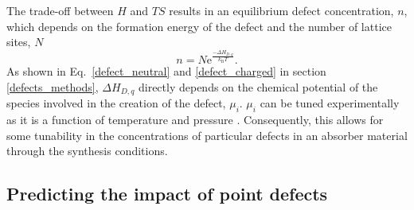 \documentclass[11pt, twoside]{report}
\begin{document}
The trade-off between $H$ and $TS$ results in an equilibrium defect concentration, $n$, which depends on the formation energy of the defect and the number of lattice sites, $N$
\begin{equation}\label{defect_conc2}
n = N \mathrm{e}^{\frac{-\Delta H_{D,q}}{k_\mathrm{B} T}}.
\end{equation}
As shown in Eq.~\ref{defect_neutral} and \ref{defect_charged} in section \ref{defects_methods}, $\Delta H_{D,q}$ directly depends on the chemical potential of the species involved in the creation of the defect, $\mu_i$. $\mu_i$ can be tuned experimentally as it is a function of temperature and pressure \cite{Adam_sulfur}. Consequently, this allows for some tunability in the concentrations of particular defects in an absorber material through the synthesis conditions.

\subsection{Predicting the impact of point defects}

\end{document}
